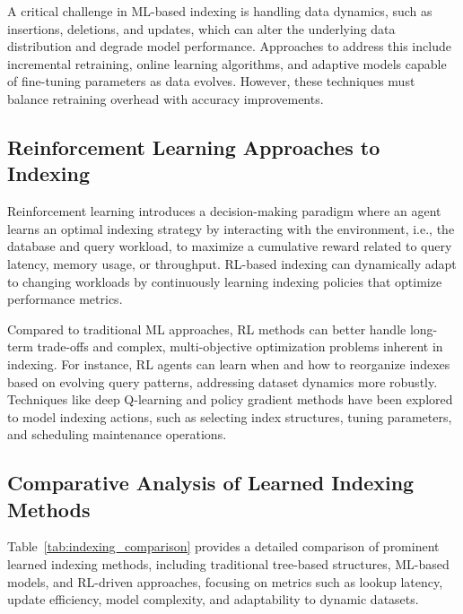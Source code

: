 \documentclass[sigconf]{acmart}
\begin{document}
A critical challenge in ML-based indexing is handling data dynamics, such as insertions, deletions, and updates, which can alter the underlying data distribution and degrade model performance. Approaches to address this include incremental retraining, online learning algorithms, and adaptive models capable of fine-tuning parameters as data evolves. However, these techniques must balance retraining overhead with accuracy improvements.

\subsection{Reinforcement Learning Approaches to Indexing}

Reinforcement learning introduces a decision-making paradigm where an agent learns an optimal indexing strategy by interacting with the environment, i.e., the database and query workload, to maximize a cumulative reward related to query latency, memory usage, or throughput. RL-based indexing can dynamically adapt to changing workloads by continuously learning indexing policies that optimize performance metrics.

Compared to traditional ML approaches, RL methods can better handle long-term trade-offs and complex, multi-objective optimization problems inherent in indexing. For instance, RL agents can learn when and how to reorganize indexes based on evolving query patterns, addressing dataset dynamics more robustly. Techniques like deep Q-learning and policy gradient methods have been explored to model indexing actions, such as selecting index structures, tuning parameters, and scheduling maintenance operations.

\subsection{Comparative Analysis of Learned Indexing Methods}

Table~\ref{tab:indexing_comparison} provides a detailed comparison of prominent learned indexing methods, including traditional tree-based structures, ML-based models, and RL-driven approaches, focusing on metrics such as lookup latency, update efficiency, model complexity, and adaptability to dynamic datasets.
\end{document}
